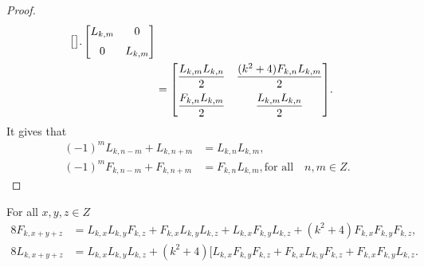 \begin{proof}
\begin{align*}
{\begin{bmatrix}{}
	\end{bmatrix}
	}.
 \begin{bmatrix}{}
    L_{k,m} & 0 \vspace{.2cm}\\
    0 & L_{k,m} \\
		\end{bmatrix}
	\\
		&={
 \begin{bmatrix}{}
    \dfrac{L_{k,m}L_{k,n}}{2} & \dfrac{(k^2+4)F_{k,n}L_{k,m}}{2}\vspace{.2cm} \\
    \dfrac{F_{k,n}L_{k,m}}{2} & \dfrac{L_{k,m}L_{k,n}}{2}\\
	\end{bmatrix}
	}.
	\end{align*}
	It gives that
\begin{align*}
(-1)^mL_{k,n-m}+L_{k,n+m}&=L_{k,n}L_{k,m},\\
(-1)^mF_{k,n-m}+F_{k,n+m}&=F_{k,n}L_{k,m}, \text{for all}\quad n,m\in Z.
\end{align*}
\end{proof}
\begin{lemma}For all $x,y,z\in Z$
\begin{align}
8F_{k,x+y+z}&=L_{k,x}L_{k,y}F_{k,z}+F_{k,x}L_{k,y}L_{k,z}+L_{k,x}F_{k,y}L_{k,z}+(k^2+4)F_{k,x}F_{k,y}F_{k,z},\\
8L_{k,x+y+z}&=L_{k,x}L_{k,y}L_{k,z}+(k^2+4)[L_{k,x}F_{k,y}F_{k,z}+F_{k,x}L_{k,y}F_{k,z}+F_{k,x}F_{k,y}L_{k,z}.
\end{align}
\end{lemma}
